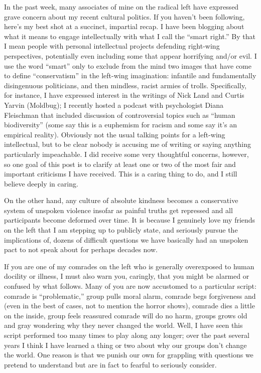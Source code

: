\documentclass[a4paper,12pt,margin=.5in]{article}
\begin{document}
In the past week, many associates of mine on the radical left have
expressed grave concern about my recent cultural politics. If you
haven't been following, here's my best shot at a succinct, impartial
recap. I have been blogging about what it means to engage intellectually
with what I call the ``smart right.'' By that I mean people with
personal intellectual projects defending right-wing perspectives,
potentially even including some that appear horrifying and/or evil. I
use the word ``smart'' only to exclude from the mind two images that
have come to define ``conservatism'' in the left-wing imagination:
infantile and fundamentally disingenuous politicians, and then mindless,
racist armies of trolls. Specifically, for instance, I have expressed
interest in the writings of Nick Land and Curtis Yarvin (Moldbug); I
recently hosted a podcast with psychologist Diana Fleischman that
included discussion of controversial topics such as ``human
biodiversity'' (some say this is a euphemism for racism and some say
it's an empirical reality). Obviously not the usual talking points for a
left-wing intellectual, but to be clear nobody is accusing me of writing
or saying anything particularly impeachable. I did receive some very
thoughtful concerns, however, so one goal of this post is to clarify at
least one or two of the most fair and important criticisms I have
received. This is a caring thing to do, and I still believe deeply in
caring.

On the other hand, any culture of absolute kindness becomes a
conservative system of unspoken violence insofar as painful truths get
repressed and all participants become deformed over time. It is because
I genuinely love my friends on the left that I am stepping up to
publicly state, and seriously pursue the implications of, dozens of
difficult questions we have basically had an unspoken pact to not speak
about for perhaps decades now.

If you are one of my comrades on the left who is generally overexposed
to human docility or illness, I must also warn you, caringly, that you
might be alarmed or confused by what follows. Many of you are now
accustomed to a particular script: comrade is ``problematic,'' group
pulls moral alarm, comrade begs forgiveness and (even in the best of
cases, not to mention the horror shows), comrade dies a little on the
inside, group feels reassured comrade will do no harm, groups grows old
and gray wondering why they never changed the world. Well, I have seen
this script performed too many times to play along any longer; over the
past several years I think I have learned a thing or two about why our
groups don't change the world. One reason is that we punish our own for
grappling with questions we pretend to understand but are in fact to
fearful to seriously consider.
\end{document}
